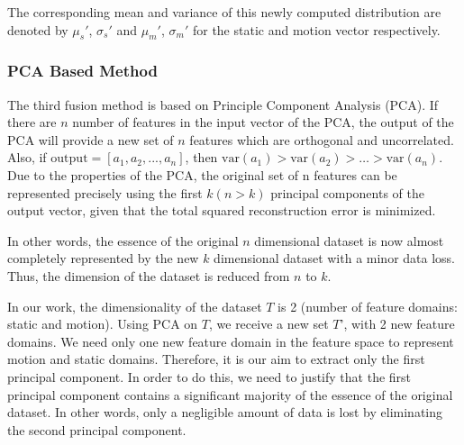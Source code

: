 The corresponding mean and variance of this newly computed distribution are denoted by $\mu_s'$, $\sigma_s'$ and $\mu_m'$, $\sigma_m'$ for the static and motion vector respectively.

\subsubsection{PCA Based Method}

The third fusion method is based on Principle Component Analysis (PCA). %
If there are $n$ number of features in the input vector of the PCA, the output of the
PCA will provide a new set of $n$ features which are orthogonal and uncorrelated. Also, if
$\mathrm{output} =[a_{1}, a_{2}, ..., a_{n}]$, then $\mathrm{var}(a_{1})> \mathrm{var}(a_{2})> \dots > \mathrm{var} (a_{n})$.
Due to the properties of the PCA, the original set of n features can be
represented precisely using the first $k (n>k)$ principal
components of the output vector, given that the total squared reconstruction error
is minimized.

In other words, the essence of the original $n$ dimensional dataset is now almost
completely represented by the new $k$ dimensional dataset with a minor data loss. Thus, the
dimension of the dataset is reduced from $n$ to $k$.


In our work, the dimensionality of the dataset $T$ is 2 (number of feature domains: static
and motion).
Using PCA on $T$, we receive a new set $T$', with 2 new feature domains. We need only one new feature
domain in the feature space to
represent motion and static domains. Therefore, it is our aim to extract only the first principal component.
In order to do this, we need to justify that the first principal component contains a significant majority of
the essence of the original dataset. In other words, only a negligible amount of data is lost by
eliminating the second principal component.

